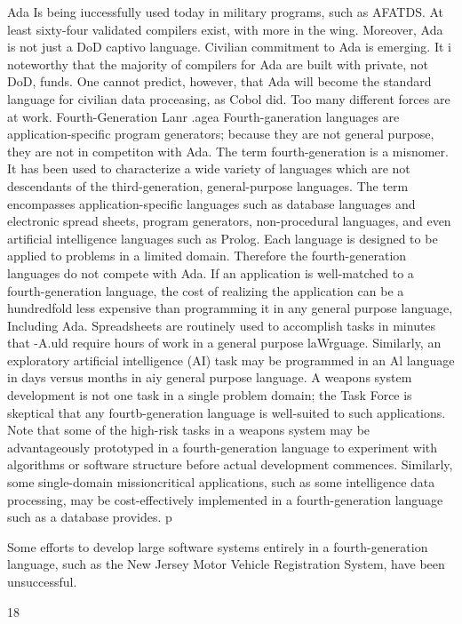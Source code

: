 \documentclass[12pt]{article}
\begin{document}
Ada Is being iuccessfully used today in military programs, such as AFATDS.
At least sixty-four validated compilers exist, with more in the wing. Moreover, Ada
is not just a DoD captivo language. Civilian commitment to Ada is emerging. It i
noteworthy that the majority of compilers for Ada are built with private, not DoD, funds.
One cannot predict, however, that Ada will become the standard language for civilian data
proceasing, as Cobol did. Too many different forces are at work.
Fourth-Generation Lanr .agea
Fourth-ganeration languages are application-specific program generators;
because they are not general purpose, they are not in competiton with Ada.
The term fourth-generation is a misnomer. It has been used to characterize a wide
variety of languages which are not descendants of the third-generation, general-purpose
languages. The term encompasses application-specific languages such as database languages and electronic spread sheets, program generators, non-procedural languages, and
even artificial intelligence languages such as Prolog. Each language is designed to be
applied to problems in a limited domain. Therefore the fourth-generation languages do
not compete with Ada.
If an application is well-matched to a fourth-generation language, the cost of
realizing the application can be a hundredfold less expensive than programming
it in any general purpose language, Including Ada.
Spreadsheets are routinely used to accomplish tasks in minutes that -A.uld require
hours of work in a general purpose laWrguage. Similarly, an exploratory artificial intelligence
(AI) task may be programmed in an Al language in days versus months in aiy general
purpose language.
A weapons system development is not one task in a single problem domain;
the Task Force is skeptical that any fourtb-generation language is well-suited
to such applications.
Note that some of the high-risk tasks in a weapons system may be advantageously
prototyped in a fourth-generation language to experiment with algorithms or software
structure before actual development commences. Similarly, some single-domain missioncritical applications, such as some intelligence data processing, may be cost-effectively
implemented in a fourth-generation language such as a database provides.
p

Some efforts to develop large software systems entirely in a fourth-generation language,
such as the New Jersey Motor Vehicle Registration System, have been unsuccessful.

18
\end{document}
